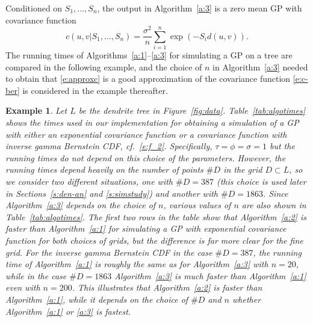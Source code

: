 \documentclass[alpha-refs]{wiley-article}
\newtheorem{ex}{Example}
\begin{document}
Conditioned on $S_1,...,S_n$, the output in Algorithm~\ref{a:3} is a zero mean GP with covariance function
\begin{equation}\label{e:approxc}
c(u,v|S_1,...,S_n)=\frac{\sigma^2}{n}\sum_{i=1}^n\exp(-S_i d(u,v)).
\end{equation}	
The running times of Algorithms~\ref{a:1}--\ref{a:3} for simulating a GP on a tree are compared in the following example,  and the  choice of $n$ in Algorithm~\ref{a:3} needed to obtain that \eqref{e:approxc} is a good approximation of the covariance function \eqref{e:c-ber} is considered in the example thereafter.

\begin{ex} 
Let $L$ be the dendrite tree in Figure~\ref{fig:data}.
Table~\ref{tab:algotimes} shows the times used in our implementation for obtaining a simulation of a GP with either an exponential covariance function or a covariance function with inverse gamma Bernstein CDF, cf.\ \eqref{e:f_2}. 
Specifically, $\tau=\phi=\sigma=1$ but the running times do not depend on this choice of the parameters. However,
the running times depend heavily on the number of points $\#D$ in the grid $D\subset L$, so we consider two different situations, one with $\#D=387$ (this choice is used later in Sections~\ref{s:den-an} and \ref{s:simstudy}) and another with $\#D=1863$. Since Algorithm~\ref{a:3} depends on the choice of $n$, various values of $n$ are also shown in Table~\ref{tab:algotimes}. The first two rows in the table show that Algorithm~\ref{a:2} is faster than Algorithm~\ref{a:1} for simulating a GP with exponential covariance function for both choices of grids, but the difference is far more clear for the fine grid. For the inverse gamma Bernstein CDF in the case $\#D=387$, the running time of Algorithm~\ref{a:1} is roughly the same as for Algorithm~\ref{a:3} with $n=20$, while in the case $\#D=1863$ Algorithm~\ref{a:3} is much faster than Algorithm~\ref{a:1} even with $n=200$. This illustrates that Algorithm~\ref{a:2} is faster than Algorithm~\ref{a:1}, while it depends on the choice of $\#D$ and $n$ whether Algorithm~\ref{a:1} or \ref{a:3} is fastest.


\end{ex}
\end{document}
